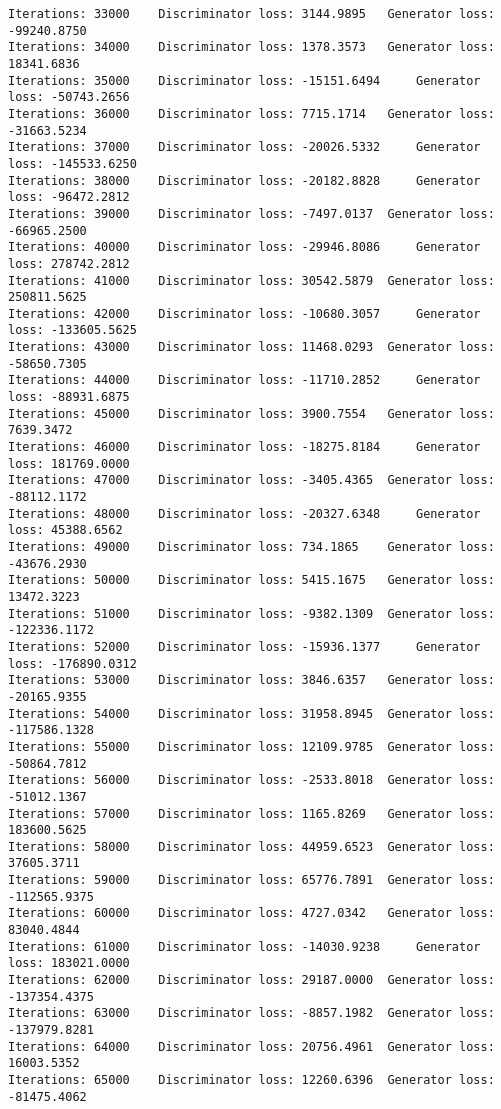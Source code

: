 \documentclass[11pt]{article}
\begin{document}
\begin{Verbatim}[commandchars=\\\{\}]
Iterations: 33000	 Discriminator loss: 3144.9895	 Generator loss: -99240.8750
Iterations: 34000	 Discriminator loss: 1378.3573	 Generator loss: 18341.6836
Iterations: 35000	 Discriminator loss: -15151.6494	 Generator loss: -50743.2656
Iterations: 36000	 Discriminator loss: 7715.1714	 Generator loss: -31663.5234
Iterations: 37000	 Discriminator loss: -20026.5332	 Generator loss: -145533.6250
Iterations: 38000	 Discriminator loss: -20182.8828	 Generator loss: -96472.2812
Iterations: 39000	 Discriminator loss: -7497.0137	 Generator loss: -66965.2500
Iterations: 40000	 Discriminator loss: -29946.8086	 Generator loss: 278742.2812
Iterations: 41000	 Discriminator loss: 30542.5879	 Generator loss: 250811.5625
Iterations: 42000	 Discriminator loss: -10680.3057	 Generator loss: -133605.5625
Iterations: 43000	 Discriminator loss: 11468.0293	 Generator loss: -58650.7305
Iterations: 44000	 Discriminator loss: -11710.2852	 Generator loss: -88931.6875
Iterations: 45000	 Discriminator loss: 3900.7554	 Generator loss: 7639.3472
Iterations: 46000	 Discriminator loss: -18275.8184	 Generator loss: 181769.0000
Iterations: 47000	 Discriminator loss: -3405.4365	 Generator loss: -88112.1172
Iterations: 48000	 Discriminator loss: -20327.6348	 Generator loss: 45388.6562
Iterations: 49000	 Discriminator loss: 734.1865	 Generator loss: -43676.2930
Iterations: 50000	 Discriminator loss: 5415.1675	 Generator loss: 13472.3223
Iterations: 51000	 Discriminator loss: -9382.1309	 Generator loss: -122336.1172
Iterations: 52000	 Discriminator loss: -15936.1377	 Generator loss: -176890.0312
Iterations: 53000	 Discriminator loss: 3846.6357	 Generator loss: -20165.9355
Iterations: 54000	 Discriminator loss: 31958.8945	 Generator loss: -117586.1328
Iterations: 55000	 Discriminator loss: 12109.9785	 Generator loss: -50864.7812
Iterations: 56000	 Discriminator loss: -2533.8018	 Generator loss: -51012.1367
Iterations: 57000	 Discriminator loss: 1165.8269	 Generator loss: 183600.5625
Iterations: 58000	 Discriminator loss: 44959.6523	 Generator loss: 37605.3711
Iterations: 59000	 Discriminator loss: 65776.7891	 Generator loss: -112565.9375
Iterations: 60000	 Discriminator loss: 4727.0342	 Generator loss: 83040.4844
Iterations: 61000	 Discriminator loss: -14030.9238	 Generator loss: 183021.0000
Iterations: 62000	 Discriminator loss: 29187.0000	 Generator loss: -137354.4375
Iterations: 63000	 Discriminator loss: -8857.1982	 Generator loss: -137979.8281
Iterations: 64000	 Discriminator loss: 20756.4961	 Generator loss: 16003.5352
Iterations: 65000	 Discriminator loss: 12260.6396	 Generator loss: -81475.4062

\end{Verbatim}
\end{document}
